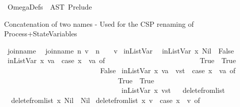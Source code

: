 %
\begin{isabellebody}%
%
%
\isamarkuptrue%
%
\isadelimtheory
%
\endisadelimtheory
%
\isatagtheory
{}\isamarkupfalse%
\ OmegaDefs\ \ AST\ Prelude\ %
\endisatagtheory
{\isafoldtheory}%
%
\isadelimtheory
%
\endisadelimtheory
%
\begin{isamarkuptext}%
Concatenation of two names - Used for the CSP renaming of Process+StateVariables%
\end{isamarkuptext}%
\isamarkuptrue%
\isamarkupfalse%
\ join{\isacharunderscore}name\isanewline
{}\isanewline
\ \ {\isachardoublequoteopen}join{\isacharunderscore}name\ n\ v\ {\isacharequal}\ {\isacharparenleft}n\ {\isacharat}\ {\isacharparenleft}{\isacharprime}{\isacharprime}{\isacharunderscore}{\isacharprime}{\isacharprime}\ {\isacharat}\ v{\isacharparenright}{\isacharparenright}{\isachardoublequoteclose}%
\isamarkuptrue%
\isamarkupfalse%
\ inListVar\isanewline
{}\isanewline
\ \ {\isachardoublequoteopen}inListVar\ x\ Nil\ {\isacharequal}\ False{\isachardoublequoteclose}\isanewline
{\isacharbar}\ {\isachardoublequoteopen}inListVar\ x\ {\isacharbrackleft}va{\isacharbrackright}\ {\isacharequal}\ {\isacharparenleft}case\ x\ {\isacharequal}\ va\ of\isanewline
\ \ \ \ \ \ \ \ \ \ \ \ \ \ \ \ \ \ \ \ \ \ \ \ \ \ True\ {\isasymRightarrow}\ True\isanewline
\ \ \ \ \ \ \ \ \ \ \ \ \ \ \ \ \ \ \ \ \ \ \ \ {\isacharbar}\ {\isacharunderscore}\ {\isasymRightarrow}\ False{\isacharparenright}{\isachardoublequoteclose}\isanewline
{\isacharbar}\ {\isachardoublequoteopen}inListVar\ x\ {\isacharparenleft}va\ {\isacharhash}\ vst{\isacharparenright}\ {\isacharequal}\ {\isacharparenleft}case\ x\ {\isacharequal}\ va\ of\isanewline
\ \ \ \ \ \ \ \ \ \ \ \ \ \ \ \ \ \ \ \ \ \ \ \ \ \ \ \ \ \ \ \ True\ {\isasymRightarrow}\ True\isanewline
\ \ \ \ \ \ \ \ \ \ \ \ \ \ \ \ \ \ \ \ \ \ \ \ \ \ \ \ \ \ {\isacharbar}\ {\isacharunderscore}\ {\isasymRightarrow}\ inListVar\ x\ vst{\isacharparenright}{\isachardoublequoteclose}\isanewline
\isanewline
\ \isanewline
{}\isamarkupfalse%
\ delete{\isacharunderscore}from{\isacharunderscore}list\isanewline
{}\isanewline
\ \ {\isachardoublequoteopen}delete{\isacharunderscore}from{\isacharunderscore}list\ x\ Nil\ {\isacharequal}\ Nil{\isachardoublequoteclose}\isanewline
{\isacharbar}\ {\isachardoublequoteopen}delete{\isacharunderscore}from{\isacharunderscore}list\ x\ {\isacharbrackleft}v{\isacharbrackright}\ {\isacharequal}\ {\isacharparenleft}case\ x\ {\isacharequal}\ v\ of\isanewline

\end{isabellebody}
